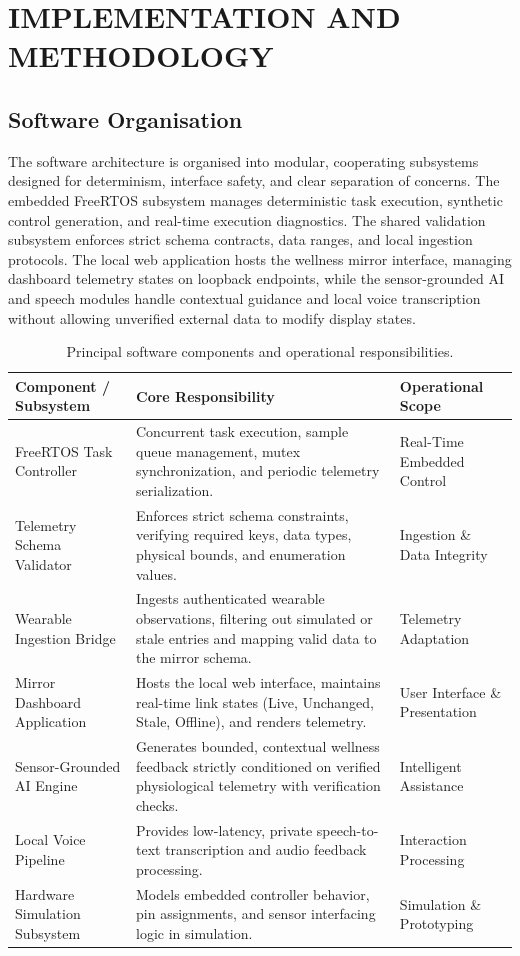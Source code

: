 \chapter{IMPLEMENTATION AND METHODOLOGY}

\section{Software Organisation}
The software architecture is organised into modular, cooperating subsystems designed for determinism, interface safety, and clear separation of concerns. The embedded FreeRTOS subsystem manages deterministic task execution, synthetic control generation, and real-time execution diagnostics. The shared validation subsystem enforces strict schema contracts, data ranges, and local ingestion protocols. The local web application hosts the wellness mirror interface, managing dashboard telemetry states on loopback endpoints, while the sensor-grounded AI and speech modules handle contextual guidance and local voice transcription without allowing unverified external data to modify display states.

\begin{table}[H]
\centering
\footnotesize
\renewcommand{\arraystretch}{0.98}
\caption{Principal software components and operational responsibilities.}
\label{tab:modules}
\begin{tabularx}{\textwidth}{p{46mm}Yp{32mm}}
\toprule
\textbf{Component / Subsystem} & \textbf{Core Responsibility} & \textbf{Operational Scope}\\
\midrule
FreeRTOS Task Controller & Concurrent task execution, sample queue management, mutex synchronization, and periodic telemetry serialization. & Real-Time Embedded Control\\
Telemetry Schema Validator & Enforces strict schema constraints, verifying required keys, data types, physical bounds, and enumeration values. & Ingestion \& Data Integrity\\
Wearable Ingestion Bridge & Ingests authenticated wearable observations, filtering out simulated or stale entries and mapping valid data to the mirror schema. & Telemetry Adaptation\\
Mirror Dashboard Application & Hosts the local web interface, maintains real-time link states (Live, Unchanged, Stale, Offline), and renders telemetry. & User Interface \& Presentation\\
Sensor-Grounded AI Engine & Generates bounded, contextual wellness feedback strictly conditioned on verified physiological telemetry with verification checks. & Intelligent Assistance\\
Local Voice Pipeline & Provides low-latency, private speech-to-text transcription and audio feedback processing. & Interaction Processing\\
Hardware Simulation Subsystem & Models embedded controller behavior, pin assignments, and sensor interfacing logic in simulation. & Simulation \& Prototyping\\
\bottomrule
\end{tabularx}
\end{table}

